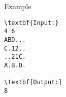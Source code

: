 Example
\begin{verbatim}
\textbf{Input:}
4 6
ABD...
C.12..
..21C.
A.B.D.

\textbf{Output:}
8
\end{verbatim}